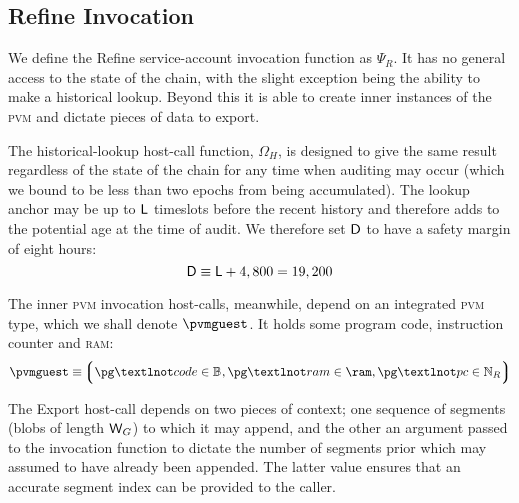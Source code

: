 \subsection{Refine Invocation}\label{sec:refineinvocation}

We define the Refine service-account invocation function as $\Psi_R$. It has no general access to the state of the \Jam chain, with the slight exception being the ability to make a historical lookup. Beyond this it is able to create inner instances of the \textsc{pvm} and dictate pieces of data to export.

The historical-lookup host-call function, $\Omega_H$, is designed to give the same result regardless of the state of the chain for any time when auditing may occur (which we bound to be less than two epochs from being accumulated). The lookup anchor may be up to $\mathsf{L}$ timeslots before the recent history and therefore adds to the potential age at the time of audit. We therefore set $\mathsf{D}$ to have a safety margin of eight hours:
\begin{equation}
  \mathsf{D} \equiv \mathsf{L} + 4,800 = 19,200
\end{equation}


The inner \textsc{pvm} invocation host-calls, meanwhile, depend on an integrated \textsc{pvm} type, which we shall denote $\pvmguest$. It holds some program code, instruction counter and \textsc{ram}:
\begin{equation}\label{eq:pvmguest}
  \pvmguest \equiv \tuple{\isa{\pg¬code}{\blob}, \isa{\pg¬ram}{\ram}, \isa{\pg¬pc}{\pvmreg}}
\end{equation}

The Export host-call depends on two pieces of context; one sequence of segments (blobs of length $\mathsf{W}_G$) to which it may append, and the other an argument passed to the invocation function to dictate the number of segments prior which may assumed to have already been appended. The latter value ensures that an accurate segment index can be provided to the caller.

